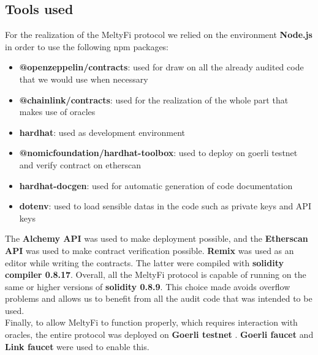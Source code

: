 \subsection{Tools used}
For the realization of the MeltyFi protocol we relied on the environment \textbf{Node.js} \cite{nodejs} in order to use the following npm packages:
\begin{itemize}
    \item \textbf{@openzeppelin/contracts}: used for draw on all the already audited code that we would use when necessary \cite{openzeppelin}
    \item \textbf{@chainlink/contracts}: used for the realization of the whole part that makes use of oracles \cite{chainlink}
    \item \textbf{hardhat}: used as development environment \cite{hardhat}
    \item \textbf{@nomicfoundation/hardhat-toolbox}: used to deploy on goerli testnet and verify contract on etherscan \cite{hardhattoolbox}
    \item \textbf{hardhat-docgen}: used for automatic generation of code documentation \cite{hardhatdocgen}
    \item \textbf{dotenv}: used to load sensible datas in the code such as private keys and API keys \cite{dotenv}
\end{itemize}
The \textbf{Alchemy API} \cite{alchemyapi} was used to make deployment possible, and the \textbf{Etherscan API} \cite{etherscanapi} was used to make contract verification possible. \textbf{Remix} \cite{remix} was used as an editor while writing the contracts. The latter were compiled with \textbf{solidity compiler 0.8.17}. Overall, all the MeltyFi protocol is capable of running on the same or higher versions of \textbf{solidity 0.8.9}. This choice made avoids overflow problems and allows us to benefit from all the audit code that was intended to be used. 
\\
\indent Finally, to allow MeltyFi to function properly, which requires interaction with oracles, the entire protocol was deployed on \textbf{Goerli testnet} \cite{goerlitestnet}. \textbf{Goerli faucet} \cite{goerlifaucet} and \textbf{Link faucet} \cite{linkfaucet} were used to enable this.

